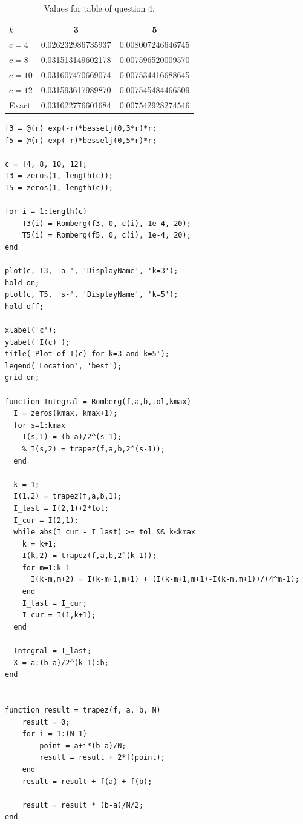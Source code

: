\documentclass[letterpaper, reqno,11pt]{article}
\begin{document}
\begin{table}
\centering
\begin{tabular}{|l|c|c|}
\hline
\( k \) & 3 & 5 \\
\hline
\( c = 4 \) & 0.026232986735937 & 0.008007246646745 \\
\hline
\( c = 8 \) & 0.031513149602178 & 0.007596520009570 \\
\hline
\( c = 10 \) & 0.031607470669074 & 0.007534416688645 \\
\hline
\( c = 12 \) & 0.031593617989870 & 0.007545484466509 \\
\hline
Exact & 0.031622776601684 & 0.007542928274546 \\
\hline
\end{tabular}
\caption{Values for table of question 4.}
\label{tab:q4}
\end{table}

\begin{lstlisting}
f3 = @(r) exp(-r)*besselj(0,3*r)*r;
f5 = @(r) exp(-r)*besselj(0,5*r)*r;

c = [4, 8, 10, 12];
T3 = zeros(1, length(c));
T5 = zeros(1, length(c));

for i = 1:length(c)
    T3(i) = Romberg(f3, 0, c(i), 1e-4, 20);
    T5(i) = Romberg(f5, 0, c(i), 1e-4, 20);
end

plot(c, T3, 'o-', 'DisplayName', 'k=3');
hold on;
plot(c, T5, 's-', 'DisplayName', 'k=5');
hold off;

xlabel('c');
ylabel('I(c)');
title('Plot of I(c) for k=3 and k=5');
legend('Location', 'best');
grid on;

function Integral = Romberg(f,a,b,tol,kmax)
  I = zeros(kmax, kmax+1);
  for s=1:kmax
    I(s,1) = (b-a)/2^(s-1);
    % I(s,2) = trapez(f,a,b,2^(s-1));
  end

  k = 1;
  I(1,2) = trapez(f,a,b,1);
  I_last = I(2,1)+2*tol;
  I_cur = I(2,1);
  while abs(I_cur - I_last) >= tol && k<kmax
    k = k+1;
    I(k,2) = trapez(f,a,b,2^(k-1));
    for m=1:k-1
      I(k-m,m+2) = I(k-m+1,m+1) + (I(k-m+1,m+1)-I(k-m,m+1))/(4^m-1);
    end
    I_last = I_cur;
    I_cur = I(1,k+1);
  end

  Integral = I_last;
  X = a:(b-a)/2^(k-1):b;
end


function result = trapez(f, a, b, N)
    result = 0;
    for i = 1:(N-1)
        point = a+i*(b-a)/N;
        result = result + 2*f(point);
    end
    result = result + f(a) + f(b);

    result = result * (b-a)/N/2;
end
\end{lstlisting}
\end{document}
